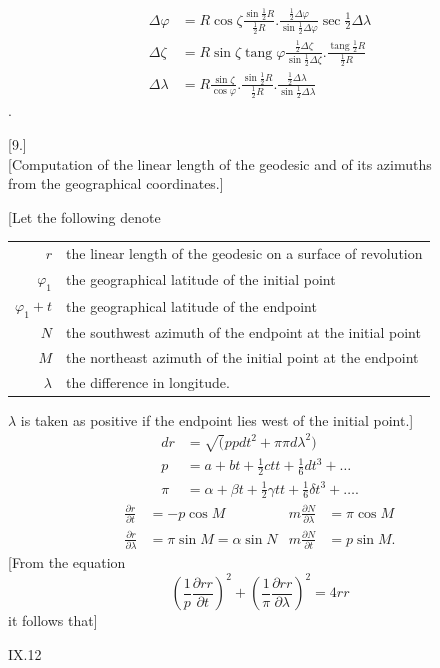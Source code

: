 \clearpage
\noindent\makebox[12mm][l]{}\par\medskip
\[
\begin{aligned}
\Delta\varphi&=R\cos\zeta\frac{\sin\tfrac12R}{\tfrac12R}.
\frac{\tfrac12\Delta\varphi}{\sin\tfrac12\Delta\varphi}\sec\tfrac12\Delta\lambda\\[1ex]
\Delta\zeta&=R\sin\zeta\operatorname{tang}\varphi\frac{\tfrac12\Delta\zeta}{\sin\tfrac12\Delta\zeta}.
\frac{\operatorname{tang}\tfrac12R}{\tfrac12R}\\[1ex]
\Delta\lambda&=R\frac{\sin\zeta}{\cos\varphi}.\frac{\sin\tfrac12R}{\tfrac12R}.
\frac{\tfrac12\Delta\lambda}{\sin\tfrac12\Delta\lambda}
\end{aligned}
\]
.
\begin{center}[9.]\\[1ex]
[Computation of the linear length of the geodesic and of its azimuths\\
from the geographical coordinates.]
\end{center}
[Let the following denote
\begin{center}
\begin{tabular}{r@{\quad}p{.87\linewidth}}
\(r\)&the linear length of the geodesic on a surface of revolution\\
\(\varphi_1\)&the geographical latitude of the initial point\\
\(\varphi_1+t\)&the geographical latitude of the endpoint\\
\(N\)&the southwest azimuth of the endpoint at the initial point\\
\(M\)&the northeast azimuth of the initial point at the endpoint\\
\(\lambda\)&the difference in longitude.
\end{tabular}
\end{center}
\noindent\(\lambda\) is taken as positive if the endpoint lies west of the initial point.]
\[
\begin{aligned}
dr&=\surd(ppdt^2+\pi\pi d\lambda^2)\\
p&=a+bt+\tfrac12ctt+\tfrac16dt^3+\ldots\\
\pi&=\alpha+\beta t+\tfrac12\gamma tt+\tfrac16\delta t^3+\ldots.
\end{aligned}
\]
\[
\begin{aligned}
\frac{\partial r}{\partial t}&=-p\cos M&
m\frac{\partial N}{\partial\lambda}&=\pi\cos M\\
\frac{\partial r}{\partial\lambda}&=\pi\sin M=\alpha\sin N&
m\frac{\partial N}{\partial t}&=p\sin M.
\end{aligned}
\]
[From the equation
\[
\left(\frac1p\frac{\partial rr}{\partial t}\right)^2+
\left(\frac1\pi\frac{\partial rr}{\partial\lambda}\right)^2=4rr
\]
\noindent it follows that]
\par\vfill\noindent IX.\hfill12

